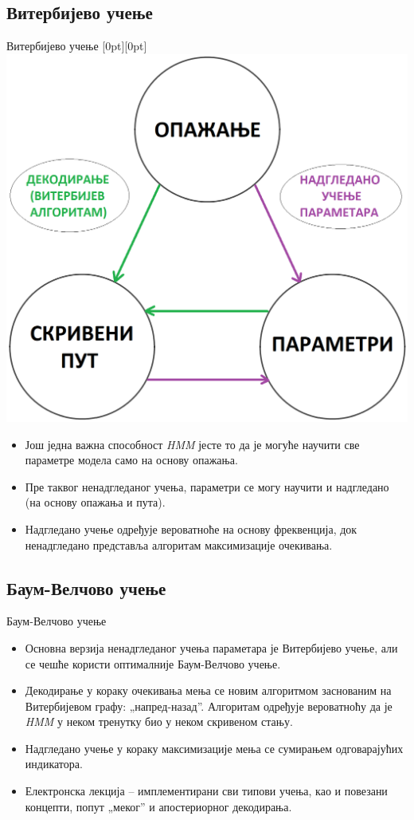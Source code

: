 \documentclass[hyperref={bookmarks=false}]{beamer}
\newcommand{\lenitem}[2][.43\linewidth]{\parbox[t]{#1}{\strut #2\strut}}
\begin{document}
\subsection{Витербијево учење}
\begin{frame}{Витербијево учење}
\mbox{}\hfill\raisebox{-\height}[0pt][0pt]{\includegraphics[width=.5\linewidth]{ema.png}}
\vspace*{-\baselineskip}

\begin{itemize}
\item \lenitem{Још једна важна способност \textit{HMM} јесте то да је могуће научити све параметре модела само на основу опажања.}
\item \lenitem{Пре таквог ненадгледаног учења, параметри се могу научити и надгледано (на основу опажања и пута).}
\item \lenitem{Надгледано учење одређује вероватноће на основу фреквенција, док ненадгледано представља алгоритам максимизације очекивања.}
\end{itemize}
\end{frame}

\subsection{Баум-Велчово учење}
\begin{frame}{Баум-Велчово учење}
\begin{itemize}
\item Основна верзија ненадгледаног учења параметара је Витербијево учење, али се чешће користи оптималније Баум-Велчово учење.
\item Декодирање у кораку очекивања мења се новим алгоритмом заснованим на Витербијевом графу: „напред-назад”. Алгоритам одређује вероватноћу да је \textit{HMM} у неком тренутку био у неком скривеном стању.
\item Надгледано учење у кораку максимизације мења се сумирањем одговарајућих индикатора.
\item Електронска лекција -- имплементирани сви типови учења, као и повезани концепти, попут „меког” и апостериорног декодирања.
\end{itemize}
\end{frame}
\end{document}
